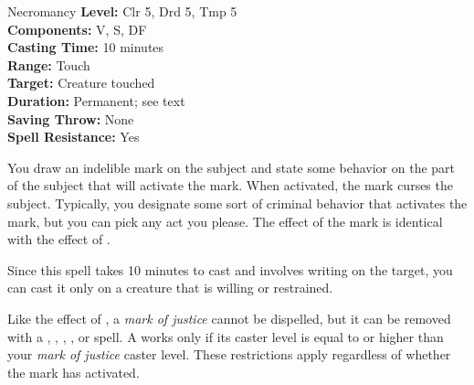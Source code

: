{Necromancy}
{
	\textbf{Level:}
	Clr 5, Drd 5, Tmp 5\\
	\textbf{Components:}
	V, S, DF\\
	\textbf{Casting Time:}
	10 minutes\\
	\textbf{Range:}
	Touch\\
	\textbf{Target:}
	Creature touched\\
	\textbf{Duration:}
	Permanent; see text\\
	\textbf{Saving Throw:}
	None\\
	\textbf{Spell Resistance:}
	Yes\\
}
{
	You draw an indelible mark on the subject and state some behavior on the part of the subject that will activate the mark. When activated, the mark curses the subject. Typically, you designate some sort of criminal behavior that activates the mark, but you can pick any act you please. The effect of the mark is identical with the effect of .

	Since this spell takes 10 minutes to cast and involves writing on the target, you can cast it only on a creature that is willing or restrained.

	Like the effect of , a \emph{mark of justice} cannot be dispelled, but it can be removed with a , , , , or  spell. A  works only if its caster level is equal to or higher than your \emph{mark of justice} caster level. These restrictions apply regardless of whether the mark has activated.

}
